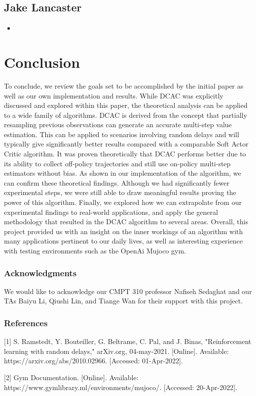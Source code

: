 \documentclass{article} %
\begin{document}
\begin{multicols}{2}
\subsection{Jake Lancaster}
\begin{itemize}[itemsep=-2pt,topsep=-5pt, leftmargin=10pt]
\item 
\end{itemize} 

\end{multicols}

\section{Conclusion}

To conclude, we review the goals set to be accomplished by the initial paper as well as our own implementation and results. While DCAC was explicitly discussed and explored within this paper, the theoretical analysis can be applied to a wide family of algorithms. DCAC is derived from the concept that partially resampling previous observations can generate an accurate multi-step value estimation. This can be applied to scenarios involving random delays and will typically give significantly better results compared with a comparable Soft Actor Critic algorithm. It was proven theoretically that DCAC performs better due to its ability to collect off-policy trajectories and still use on-policy multi-step estimators without bias. As shown in our implementation of the algorithm, we can confirm these theoretical findings. Although we had significantly fewer experimental steps, we were still able to draw meaningful results proving the power of this algorithm. Finally, we explored how we can extrapolate from our experimental findings to real-world applications, and apply the general methodology that resulted in the DCAC algorithm to several areas. Overall, this project provided us with an insight on the inner workings of an algorithm with many applications pertinent to our daily lives, as well as interesting experience with testing environments such as the OpenAi Mujoco gym.


\subsubsection*{Acknowledgments}
We would like to acknowledge our CMPT 310 professor Nafiseh Sedaghat and our TAs 
Baiyu Li, Qiushi Lin, and Tiange Wan for their support with this project.

\subsubsection*{References}
\small{
[1] S. Ramstedt, Y. Bouteiller, G. Beltrame, C. Pal, and J. Binas, 
      "Reinforcement learning with random delays," arXiv.org, 04-may-2021. [Online]. 
      Available: https://arxiv.org/abs/2010.02966. [Accessed: 01-Apr-2022].

[2] Gym Documentation. [Online]. Available: https://www.gymlibrary.ml/environments/mujoco/. [Accessed: 20-Apr-2022]. 
}
\end{document}
